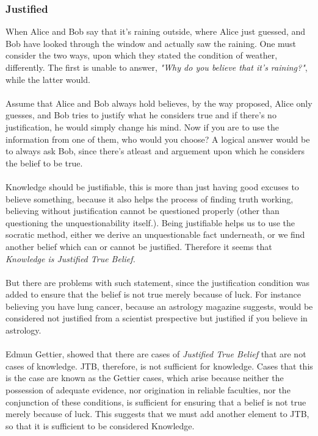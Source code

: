 \documentclass[10pt,a4paper]{article}
\begin{document}
                    \subsubsection{Justified} When Alice and Bob say that it's raining outside, where Alice just guessed, and Bob have looked through the window and actually saw the raining. One must consider the two ways, upon which they stated the condition of weather, differently. The first is unable to answer, \textit{"Why do you believe that it's raining?"}, while the latter would.
                    \\
                    \\
                    Assume that Alice and Bob always hold believes, by the way proposed, Alice only guesses, and Bob tries to justify what he considers true and if there's no justification, he would simply change his mind. Now if you are to use the information from one of them, who would you choose? A logical answer would be to always ask Bob, since there's atleast and arguement upon which he considers the belief to be true. 
                    \\
                    \\
                    Knowledge should be justifiable, this is more than just having good excuses to believe something, because it also helps the process of finding truth working, believing without justification cannot be questioned properly (other than questioning the unquestionability itself.). Being justifiable helps us to use the socratic method, either we derive an unquestionable fact underneath, or we find another belief which can or cannot be justified. Therefore it seems that \textit{Knowledge is Justified True Belief.}
                    \\
                    \\
                    But there are problems with such statement, since the justification condition was added to ensure that the belief is not true merely because of luck. For instance believing you have lung cancer, because an astrology magazine suggests, would be considered not justified from a scientist prespective but justified if you believe in astrology.
                    \\
                    \\
                    Edmun Gettier, showed that there are cases of \textit{Justified True Belief} that are not cases of knowledge. JTB, therefore, is not sufficient for knowledge. Cases that this is the case are known as the Gettier cases, which arise because neither the possession of adequate evidence, nor origination in reliable faculties, nor the conjunction of these conditions, is sufficient for ensuring that a belief is not true merely because of luck. This suggests that we must add another element to JTB, so that it is sufficient to be considered Knowledge.\cite{sep-epistemology}
                    \\
                    \\
\end{document}
